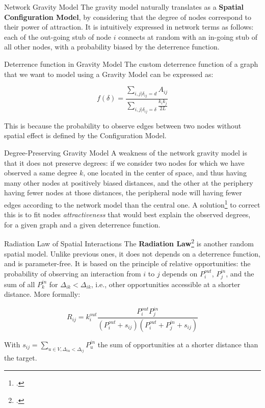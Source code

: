 \documentclass[a4paper,11pt]{book}
\begin{document}
\begin{textbox}{Network Gravity Model}
The gravity model naturally translates as a \textbf{Spatial Configuration Model}, by considering that the degree of nodes correspond to their power of attraction. It is intuitively expressed in network terms as follows: each of the out-going stub of node $i$ connects at random with an in-going stub of all other nodes, with a probability biased by the deterrence function.
\end{textbox}

\begin{textbox}{Deterrence function in Gravity Model}
The custom deterrence function of a graph that we want to model using a Gravity Model can be expressed as:

\[
f(\delta)=\frac{\sum_{i,j|\delta_{ij}=d}A_{ij}}{\sum_{i,j|\delta_{ij}=\delta}\frac{k_ik_j}{2L}}
\]

This is because the probability to observe edges between two nodes without spatial effect is defined by the Configuration Model.

\end{textbox}



\begin{textbox}{Degree-Preserving Gravity Model}
A weakness of the network gravity model is that it does not preserve degrees: if we consider two nodes for which we have observed a same degree $k$, one located in the center of space, and thus having many other nodes at positively biased distances, and the other at the periphery having fewer nodes at those distances, the peripheral node will having fewer edges according to the network model than the central one. A solution\footcite{cazabet2017enhancing} to correct this is to fit nodes \textit{attractiveness} that would best explain the observed degrees, for a given graph and a given deterrence function.
\end{textbox}






\begin{textbox}{Radiation Law of Spatial Interactions}
The \textbf{Radiation Law}\footcite{simini2012universal} is another random spatial model. Unlike previous ones, it does not depends on a deterrence function, and is parameter-free. It is based on the principle of relative opportunities: the probability of observing an interaction from $i$ to $j$ depends on $P_i^{out}$, $P_j^{in}$, and the sum of all $P_k^{in}$ for $\Delta_{ik}<\Delta_{ik}$, i.e., other opportunities accessible at a shorter distance.
More formally:

\[
R_{ij}=k_i^{out}\frac{P_i^{out} P_j^{in}}{(P_i^{out}+s_{ij})(P_i^{out}+P_j^{in}+s_{ij})}
\]

With $s_{ij}=\sum\limits_{u\in V,\Delta_{iu}<\Delta_{ij}}P_u^{in}$ the sum of opportunities at a shorter distance than the target. 
\end{textbox}
\end{document}
